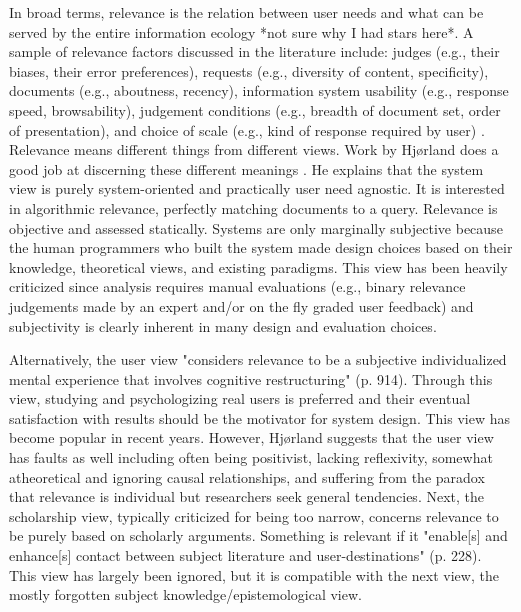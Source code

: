 In broad terms, relevance is the relation between user needs and what can be served by the entire information ecology \cite{Hjorland2010} *not sure why I had stars here*. A sample of relevance factors discussed in the literature include: judges (e.g., their biases, their error preferences), requests (e.g., diversity of content, specificity), documents (e.g., aboutness, recency), information system usability (e.g., response speed, browsability), judgement conditions (e.g., breadth of document set, order of presentation), and choice of scale (e.g., kind of response required by user) \cite{Schamber1994}. Relevance means different things from different views. Work by Hjørland does a good job at discerning these different meanings \cite{Hjorland2010}. He explains that the system view is purely system-oriented and practically user need agnostic. It is interested in algorithmic relevance, perfectly matching documents to a query. Relevance is objective and assessed statically. Systems are only marginally subjective because the human programmers who built the system made design choices based on their knowledge, theoretical views, and existing paradigms. This view has been heavily criticized since analysis requires manual evaluations (e.g., binary relevance judgements made by an expert and/or on the fly graded user feedback) and subjectivity is clearly inherent in many design and evaluation choices.

Alternatively, the user view "considers relevance to be a subjective individualized mental experience that involves cognitive restructuring" \cite{Borlund2003}(p. 914). Through this view, studying and psychologizing real users is preferred and their eventual satisfaction with results should be the motivator for system design. This view has become popular in recent years. However, Hjørland suggests that the user view has faults as well including often being positivist, lacking reflexivity, somewhat atheoretical and ignoring causal relationships, and suffering from the paradox that relevance is individual but researchers seek general tendencies. Next, the scholarship view, typically criticized for being too narrow, concerns relevance to be purely based on scholarly arguments. Something is relevant if it "enable[s] and enhance[s] contact between subject literature and user-destinations" \cite{Hjorland2010}(p. 228). This view has largely been ignored, but it is compatible with the next view, the mostly forgotten subject knowledge/epistemological view.

